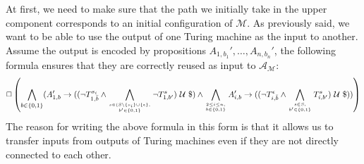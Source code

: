 \documentclass{llncs}
\newcommand{\automaton}{\ensuremath{\mathcal{A}}}
\newcommand{\tm}{\ensuremath{\mathcal{M}}}
\newcommand{\until}{\ensuremath{\mathcal{~U~}}}
\begin{document}
At first, we need to make sure that the path we initially take in the
upper component corresponds to an initial configuration of $\tm$. As
previously said, we want to be able to use the output of one Turing
machine as the input to another.  Assume the output is encoded by
propositions $A_{1,b_1}',\ldots, A_{n,b_n}'$, the following formula
ensures that they are correctly reused as input to $\automaton_\tm$:
\begin{equation*}
  \Box \left( \bigwedge_{b\in \{0,1\}}(A_{1,b}' \rightarrow (( \neg
  T_{1,\bar{b}}^{s_i}\wedge \bigwedge_{s\in (S\setminus\{s_i\}\cup
    \{\epsilon\},\atop b'\in\{0,1\}} \neg T_{1,b'}^s) \until \$)
  \wedge \bigwedge_{2\le i\le n,\atop b\in\{0,1\}} A'_{i,b}
  \rightarrow ((\neg T_{i,\bar{b}}^\epsilon \wedge\bigwedge_{s\in
    S,\atop b'\in \{0,1\}} T_{i,b'}^s)\until \$)) \right)
\end{equation*}
The reason for writing the above formula in this form is that it
allows us to transfer inputs from outputs of Turing machines even if
they are not directly connected to each other.
\end{document}
